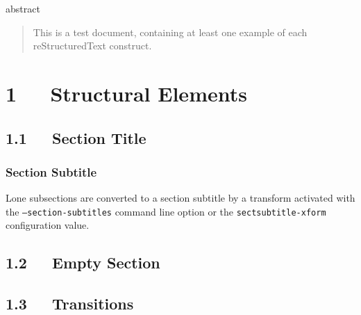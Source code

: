 \documentclass[a4paper]{article}
\begin{document}
\begin{DUclass}{abstract}
\begin{quote}

This is a test document, containing at least one example of each
reStructuredText construct.
\end{quote}
\end{DUclass}




\pagebreak[4] %

\label{table-of-contents}
\renewcommand{\contentsname}{Table of Contents}
\tableofcontents


\section{1   Structural Elements%
  \label{structural-elements}%
}


\subsection{1.1   Section Title%
  \label{section-title}%
}
\subsubsection*{Section Subtitle}

Lone subsections are converted to a section subtitle by a transform
activated with the \texttt{--section-subtitles} command line option or the
\texttt{sectsubtitle-xform} configuration value.


\subsection{1.2   Empty Section%
  \label{empty-section}%
}


\subsection{1.3   Transitions%
  \label{transitions}%
}
\end{document}

